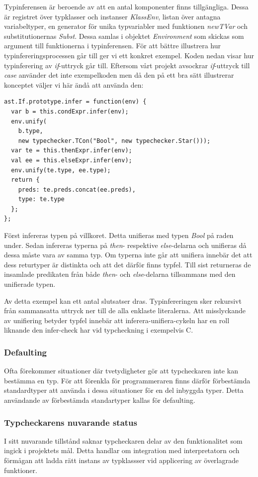 Typinferensen är beroende av att en antal komponenter finns tillgängliga. Dessa är registret över typklasser och instanser \emph{KlassEnv}, listan över antagna variabeltyper, en generator för unika typvariabler med funktionen \emph{newTVar} och substitutionernas \emph{Subst}. Dessa samlas i objektet \emph{Environment} som skickas som argument till funktionerna i typinferensen. 
För att bättre illustrera hur typinfereringsprocessen går till ger vi ett konkret exempel. Koden nedan visar hur typinferering av \emph{if}-uttryck går till. Eftersom vårt projekt avsockrar \emph{if}-uttryck till \emph{case} använder det inte exempelkoden men då den på ett bra sätt illustrerar konceptet väljer vi här ändå att använda den:

\begin{lstlisting}
ast.If.prototype.infer = function(env) {
  var b = this.condExpr.infer(env);
  env.unify(
    b.type,
    new typechecker.TCon("Bool", new typechecker.Star()));
  var te = this.thenExpr.infer(env);
  val ee = this.elseExpr.infer(env);
  env.unify(te.type, ee.type);
  return {
    preds: te.preds.concat(ee.preds),
    type: te.type
  };
};
\end{lstlisting}
Först infereras typen på villkoret. Detta unifieras med typen \emph{Bool} på raden under. Sedan infereras typerna på \emph{then}- respektive \emph{else}-delarna och unifieras då dessa måste vara av samma typ. Om typerna inte går att unifiera innebär det att dess returtyper är distinkta och att det därför finns typfel. Till sist returneras de insamlade predikaten från både \emph{then}- och \emph{else}-delarna tillsammans med den unifierade typen.

Av detta exempel kan ett antal slutsatser dras. Typinfereringen sker rekursivt från sammansatta uttryck ner till de alla enklaste literalerna. Att misslyckande av unifiering betyder typfel innebär att inferera-unifiera-cykeln har en roll liknande den infer-check har vid typcheckning i exempelvis C.

\subsubsection{Defaulting}
Ofta förekommer situationer där tvetydigheter gör att typcheckaren inte kan bestämma en typ. För att förenkla för programmeraren finns därför förbestämda standardtyper att använda i dessa situationer för en del inbyggda typer. Detta användande av förbestämda standartyper kallas för defaulting.

\subsubsection{Typcheckarens nuvarande status}
I sitt nuvarande tillstånd saknar typcheckaren delar av den funktionalitet som ingick i projektets mål. Detta handlar om integration med interpretatorn och förmågan att ladda rätt instans av typklassser vid applicering av överlagrade funktioner. 

